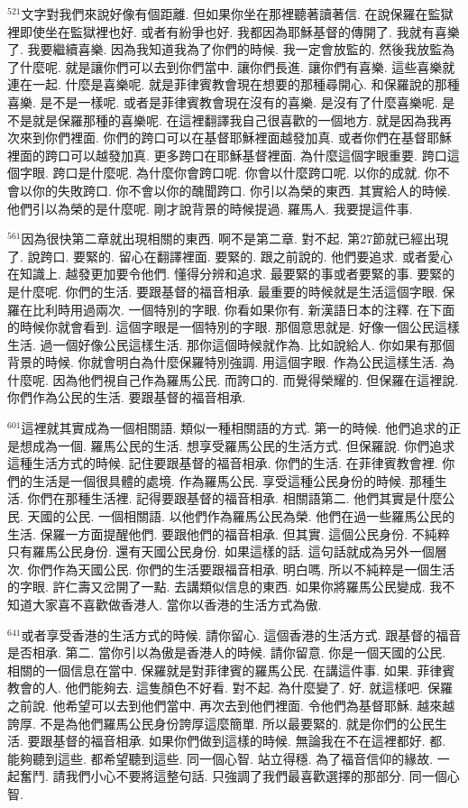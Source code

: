 \documentclass{book}
\begin{document}
$^{521}$文字對我們來說好像有個距離.
但如果你坐在那裡聽著讀著信.
在說保羅在監獄裡即使坐在監獄裡也好.
或者有紛爭也好.
我都因為耶穌基督的傳開了.
我就有喜樂了.
我要繼續喜樂.
因為我知道我為了你們的時候.
我一定會放監的.
然後我放監為了什麼呢.
就是讓你們可以去到你們當中.
讓你們長進.
讓你們有喜樂.
這些喜樂就連在一起.
什麼是喜樂呢.
就是菲律賓教會現在想要的那種尋開心.
和保羅說的那種喜樂.
是不是一樣呢.
或者是菲律賓教會現在沒有的喜樂.
是沒有了什麼喜樂呢.
是不是就是保羅那種的喜樂呢.
在這裡翻譯我自己很喜歡的一個地方.
就是因為我再次來到你們裡面.
你們的跨口可以在基督耶穌裡面越發加真.
或者你們在基督耶穌裡面的跨口可以越發加真.
更多跨口在耶穌基督裡面.
為什麼這個字眼重要.
跨口這個字眼.
跨口是什麼呢.
為什麼你會跨口呢.
你會以什麼跨口呢.
以你的成就.
你不會以你的失敗跨口.
你不會以你的醜聞跨口.
你引以為榮的東西.
其實給人的時候.
他們引以為榮的是什麼呢.
剛才說背景的時候提過.
羅馬人.
我要提這件事.

$^{561}$因為很快第二章就出現相關的東西.
啊不是第二章.
對不起.
第27節就已經出現了.
說跨口.
要緊的.
留心在翻譯裡面.
要緊的.
跟之前說的.
他們要追求.
或者愛心在知識上.
越發更加要令他們.
懂得分辨和追求.
最要緊的事或者要緊的事.
要緊的是什麼呢.
你們的生活.
要跟基督的福音相承.
最重要的時候就是生活這個字眼.
保羅在比利時用過兩次.
一個特別的字眼.
你看如果你有.
新漢語日本的注釋.
在下面的時候你就會看到.
這個字眼是一個特別的字眼.
那個意思就是.
好像一個公民這樣生活.
過一個好像公民這樣生活.
那你這個時候就作為.
比如說給人.
你如果有那個背景的時候.
你就會明白為什麼保羅特別強調.
用這個字眼.
作為公民這樣生活.
為什麼呢.
因為他們視自己作為羅馬公民.
而誇口的.
而覺得榮耀的.
但保羅在這裡說.
你們作為公民的生活.
要跟基督的福音相承.

$^{601}$這裡就其實成為一個相關語.
類似一種相關語的方式.
第一的時候.
他們追求的正是想成為一個.
羅馬公民的生活.
想享受羅馬公民的生活方式.
但保羅說.
你們追求這種生活方式的時候.
記住要跟基督的福音相承.
你們的生活.
在菲律賓教會裡.
你們的生活是一個很具體的處境.
作為羅馬公民.
享受這種公民身份的時候.
那種生活.
你們在那種生活裡.
記得要跟基督的福音相承.
相關語第二.
他們其實是什麼公民.
天國的公民.
一個相關語.
以他們作為羅馬公民為榮.
他們在過一些羅馬公民的生活.
保羅一方面提醒他們.
要跟他們的福音相承.
但其實.
這個公民身份.
不純粹只有羅馬公民身份.
還有天國公民身份.
如果這樣的話.
這句話就成為另外一個層次.
你們作為天國公民.
你們的生活要跟福音相承.
明白嗎.
所以不純粹是一個生活的字眼.
許仁壽又岔開了一點.
去講類似信息的東西.
如果你將羅馬公民變成.
我不知道大家喜不喜歡做香港人.
當你以香港的生活方式為傲.

$^{641}$或者享受香港的生活方式的時候.
請你留心.
這個香港的生活方式.
跟基督的福音是否相承.
第二.
當你引以為傲是香港人的時候.
請你留意.
你是一個天國的公民.
相關的一個信息在當中.
保羅就是對菲律賓的羅馬公民.
在講這件事.
如果.
菲律賓教會的人.
他們能夠去.
這隻顏色不好看.
對不起.
為什麼變了.
好.
就這樣吧.
保羅之前說.
他希望可以去到他們當中.
再次去到他們裡面.
令他們為基督耶穌.
越來越誇厚.
不是為他們羅馬公民身份誇厚這麼簡單.
所以最要緊的.
就是你們的公民生活.
要跟基督的福音相承.
如果你們做到這樣的時候.
無論我在不在這裡都好.
都.
能夠聽到這些.
都希望聽到這些.
同一個心智.
站立得穩.
為了福音信仰的緣故.
一起奮鬥.
請我們小心不要將這整句話.
只強調了我們最喜歡選擇的那部分.
同一個心智.
\end{document}
